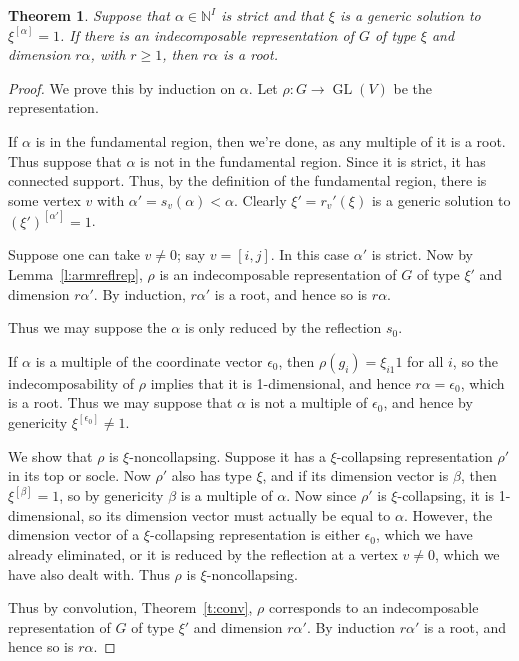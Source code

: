 \documentclass{amsart}
\theoremstyle{plain}
\newtheorem{thm}{Theorem}[section]
\theoremstyle{definition}
\theoremstyle{remark}
\newcommand{\N}{\mathbb{N}}
\DeclareMathOperator{\GL}{GL}
\begin{document}
\begin{thm}
Suppose that $\alpha\in\N^I$ is strict and
that $\xi$ is a generic solution to $\xi^{[\alpha]}=1$.
If there is an indecomposable representation of $G$ of type $\xi$
and dimension $r\alpha$, with $r\ge 1$, then $r\alpha$ is a root.
\end{thm}


\begin{proof}
We prove this by induction on $\alpha$. Let $\rho:G\to \GL(V)$ be the representation.

If $\alpha$ is in the fundamental region, then we're done,
as any multiple of it is a root.
Thus suppose that $\alpha$ is not in the fundamental region.
Since it is strict, it has connected support.
Thus, by the definition of the fundamental region, there is some
vertex $v$ with $\alpha'=s_v(\alpha)<\alpha$.
Clearly $\xi'=r_v'(\xi)$ is a generic solution to $(\xi')^{[\alpha']}=1$.

Suppose one can take $v\neq 0$; say $v=[i,j]$. In this case $\alpha'$ is
strict. Now by Lemma~\ref{l:armreflrep}, $\rho$ is an indecomposable
representation of $G$ of type $\xi'$ and dimension $r\alpha'$. By induction,
$r\alpha'$ is a root, and hence so is $r\alpha$.

Thus we may suppose the $\alpha$ is only reduced by the reflection $s_0$.

If $\alpha$ is a multiple of the coordinate vector $\epsilon_0$,
then $\rho(g_i)=\xi_{i1} 1$ for all $i$, so the indecomposability
of $\rho$ implies that it is 1-dimensional, and hence $r\alpha=\epsilon_0$,
which is a root. Thus we may suppose that $\alpha$ is not a multiple of $\epsilon_0$,
and hence by genericity $\xi^{[\epsilon_0]}\neq 1$.

We show that $\rho$ is $\xi$-noncollapsing. Suppose it has a $\xi$-collapsing
representation $\rho'$ in its top or socle. Now $\rho'$ also has
type $\xi$, and if its dimension vector is $\beta$, then $\xi^{[\beta]}=1$,
so by genericity $\beta$ is a multiple of $\alpha$. Now since $\rho'$ is
$\xi$-collapsing, it is 1-dimensional, so its dimension vector must
actually be equal to $\alpha$. However, the dimension vector of
a $\xi$-collapsing representation is either $\epsilon_0$, which we have
already eliminated, or it is reduced by the reflection at a vertex $v\neq 0$,
which we have also dealt with. Thus $\rho$ is $\xi$-noncollapsing.

Thus by convolution, Theorem~\ref{t:conv}, $\rho$ corresponds to an indecomposable
representation of $G$ of type $\xi'$ and dimension $r\alpha'$.
By induction $r\alpha'$ is a root, and hence so is $r\alpha$.
\end{proof}
\end{document}
